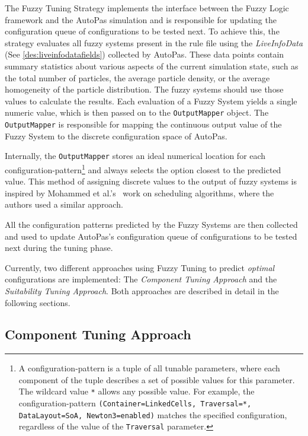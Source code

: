 The Fuzzy Tuning Strategy implements the interface between the Fuzzy Logic framework and the AutoPas simulation and is responsible for updating the configuration queue of configurations to be tested next. To achieve this, the strategy evaluates all fuzzy systems present in the rule file using the \emph{LiveInfoData} (See \ref{des:liveinfodatafields}) collected by AutoPas. These data points contain summary statistics about various aspects of the current simulation state, such as the total number of particles, the average particle density, or the average homogeneity of the particle distribution. The fuzzy systems should use those values to calculate the results. Each evaluation of a Fuzzy System yields a single numeric value, which is then passed on to the \texttt{OutputMapper} object. The \texttt{OutputMapper} is responsible for mapping the continuous output value of the Fuzzy System to the discrete configuration space of AutoPas.

Internally, the \texttt{OutputMapper} stores an ideal numerical location for each configuration-pattern\footnote{A configuration-pattern is a tuple of all tunable parameters, where each component of the tuple describes a set of possible values for this parameter. The wildcard value \texttt{*} allows any possible value. For example, the configuration-pattern \texttt{(Container=LinkedCells, Traversal=*, DataLayout=SoA, Newton3=enabled)} matches the specified configuration, regardless of the value of the \texttt{Traversal} parameter.} and always selects the option closest to the predicted value. This method of assigning discrete values to the output of fuzzy systems is inspired by Mohammed et al.'s~\cite{Mohammed2022} work on scheduling algorithms, where the authors used a similar approach.

All the configuration patterns predicted by the Fuzzy Systems are then collected and used to update AutoPas's configuration queue of configurations to be tested next during the tuning phase.


Currently, two different approaches using Fuzzy Tuning to predict \emph{optimal} configurations are implemented: The \emph{Component Tuning Approach} and the \emph{Suitability Tuning Approach}. Both approaches are described in detail in the following sections.


\subsection{Component Tuning Approach}
\label{sec:componentTuningApproach}


